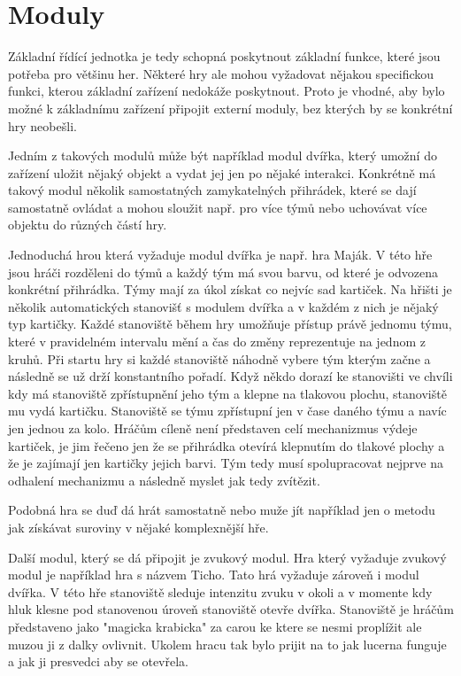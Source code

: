 \vspace{-10mm}
\section{Moduly}
Základní řídící jednotka je tedy schopná poskytnout základní funkce, které jsou potřeba pro většinu her.
Některé hry ale mohou vyžadovat nějakou specifickou funkci, kterou základní zařízení nedokáže poskytnout.
Proto je vhodné, aby bylo možné k základnímu zařízení připojit externí moduly, bez kterých by se konkrétní hry neobešli.

Jedním z takových modulů může být například modul dvířka, který umožní do zařízení uložit nějaký objekt a vydat jej jen po nějaké interakci.
Konkrétně má takový modul několik samostatných zamykatelných přihrádek, které se dají samostatně ovládat a mohou sloužit např. pro více týmů nebo uchovávat více objektu do různých částí hry.

Jednoduchá hrou která vyžaduje modul dvířka je např. hra Maják. %
V této hře jsou hráči rozděleni do týmů a každý tým má svou barvu, od které je odvozena konkrétní přihrádka. 
Týmy mají za úkol získat co nejvíc sad kartiček.
Na hřišti je několik automatických stanovišť s modulem dvířka a v každém z nich je nějaký typ kartičky.
Každé stanoviště během hry umožňuje přístup právě jednomu týmu, které v pravidelném intervalu mění a čas do změny reprezentuje na jednom z kruhů.
Při startu hry si každé stanoviště náhodně vybere tým kterým začne a následně se už drží konstantního pořadí.
Když někdo dorazí ke stanovišti ve chvíli kdy má stanoviště zpřístupnění jeho tým a klepne na tlakovou plochu, stanoviště mu vydá kartičku.
Stanoviště se týmu zpřístupní jen v čase daného týmu a navíc jen jednou za kolo.
Hráčům cíleně není představen celí mechanizmus výdeje kartiček, je jim řečeno jen že se přihrádka otevírá klepnutím do tlakové plochy a že je zajímají jen kartičky jejich barvi. 
Tým tedy musí spolupracovat nejprve na odhalení mechanizmu a následně myslet jak tedy zvítězit.

Podobná hra se duď dá hrát samostatně nebo muže jít například jen o metodu jak získávat suroviny v nějaké komplexnější hře.

Další modul, který se dá připojit je zvukový modul.
Hra který vyžaduje zvukový modul je například hra s názvem Ticho.
Tato hrá vyžaduje zároveň i modul dvířka.
V této hře stanoviště sleduje intenzitu zvuku v okoli a v momente kdy hluk klesne pod stanovenou úroveň stanoviště otevře dvířka. 
Stanoviště je hráčům představeno jako "magicka krabicka" za carou ke ktere se nesmi proplížit ale muzou ji z dalky ovlivnit.
Ukolem hracu tak bylo prijit na to jak lucerna funguje a jak ji presvedci aby se otevřela.

